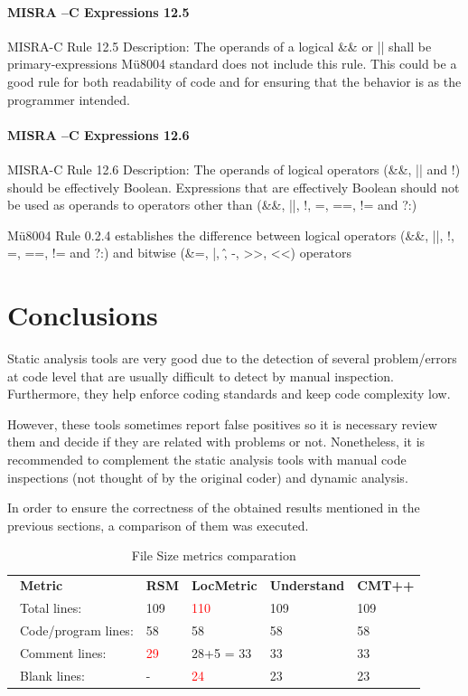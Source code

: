 \paragraph{MISRA –C Expressions 12.5}
MISRA-C Rule 12.5 Description: The operands of a logical \&\& or || shall be primary-expressions
Mü8004 standard does not include this rule. This could be a good rule for both readability of code and for ensuring that the behavior is as the programmer intended.

\paragraph{MISRA –C Expressions 12.6}
MISRA-C Rule 12.6 Description: The operands of logical operators (\&\&, || and !) should be effectively Boolean. Expressions that are effectively Boolean should not be used as operands to operators other than (\&\&, ||, !, =, ==, != and ?:)

Mü8004 Rule 0.2.4 establishes the difference between logical operators (\&\&, ||, !, =, ==, != and ?:) and bitwise (\&=, |, \^, -, >>, <<) operators


\section{Conclusions}

Static analysis tools are very good due to the detection of several problem/errors at code level that are usually difficult to detect by manual inspection. Furthermore, they help enforce coding standards and keep code complexity low.

However, these tools sometimes report false positives so it is necessary review them and decide if they are related with problems or not. Nonetheless, it is recommended to complement the static analysis tools with manual code inspections (not thought of by the original coder) and dynamic analysis.

In order to ensure the correctness of the obtained results mentioned in the previous sections, a comparison of them was executed.

\begin{longtable}{||p{}|p{}|p{}|p{}|p{}||}
  \caption{File Size metrics comparation}\\
    \hline\hline
    \endhead
    \hline\hline
    \endfoot
\multicolumn{5}{||l||}{\textbf{Bitwalker.c}}
\\\hline
\ \textbf{Metric} & \textbf{RSM} & \textbf{LocMetric} & \textbf{Understand} & \textbf{CMT++}
\\\hline
\ Total lines: & 109 & \textcolor{red}{110} & 109 & 109
\\\hline
\ Code/program lines: & 58 & 58 & 58 & 58
\\\hline
\ Comment lines: & \textcolor{red}{29} & 28+5 = 33 & 33 & 33 
\\\hline
\ Blank lines: & - & \textcolor{red}{24} & 23 & 23
 \\\hline
\end{longtable}

